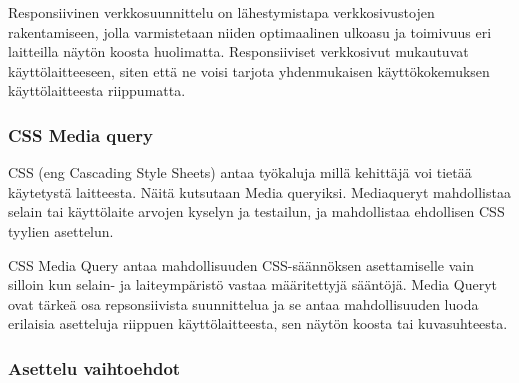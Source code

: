 \documentclass[11pt,a4paper,titlepage,oneside]{article}
\begin{document}
Responsiivinen verkkosuunnittelu on lähestymistapa verkkosivustojen rakentamiseen,
jolla varmistetaan niiden optimaalinen ulkoasu ja toimivuus eri laitteilla näytön koosta huolimatta. 
Responsiiviset verkkosivut mukautuvat käyttölaitteeseen, siten että ne voisi tarjota yhdenmukaisen käyttökokemuksen käyttölaitteesta riippumatta.
\medskip





\subsubsection{CSS Media query}










CSS (eng Cascading Style Sheets) antaa työkaluja millä kehittäjä voi tietää käytetystä laitteesta.
Näitä kutsutaan Media queryiksi.
Mediaqueryt mahdollistaa selain tai käyttölaite arvojen kyselyn ja testailun, ja mahdollistaa ehdollisen CSS tyylien asettelun.

\medskip





CSS Media Query antaa mahdollisuuden CSS-säännöksen asettamiselle vain silloin kun selain- ja laiteympäristö vastaa määritettyjä sääntöjä. 
Media Queryt ovat tärkeä osa repsonsiivista suunnittelua ja se antaa mahdollisuuden luoda erilaisia asetteluja riippuen käyttölaitteesta,
sen näytön koosta tai kuvasuhteesta.












\subsubsection{Asettelu vaihtoehdot}

\end{document}
